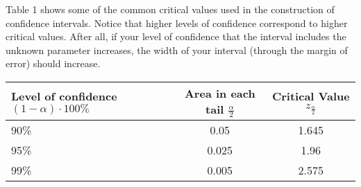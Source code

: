 \documentclass{report}
\begin{document}
    \pagebreak \bigbreak \noindent 
    Table 1 shows some of the common critical values used in the construction of confidence intervals. Notice that higher levels of confidence correspond to higher critical values. After all, if your level of confidence that the interval includes the unknown parameter increases, the width of your interval (through the margin of error) should increase.
    \begin{center}
        \begin{center}
            \begin{tabular}{|l|c|c|}
            \hline
            Level of confidence $(1-\alpha) \cdot 100\%$ & Area in each tail $\frac{\alpha}{2}$ & Critical Value $z_{\frac{\alpha}{2}}$ \\
            	\hline
            90\% & 0.05 & 1.645   \\
            	\hline
            95\% & 0.025 & 1.96 \\
            \hline 
            99\% & 0.005 & 2.575 \\
            \hline
            \end{tabular}
        \end{center}
    \end{center}
\end{document}
